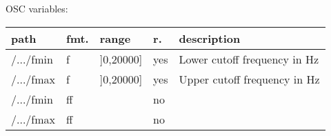 \begin{snugshade}
{\footnotesize
\label{osctab:tascarapbandpass}
OSC variables:
\nopagebreak

\begin{tabularx}{\textwidth}{llllX}
\hline
path & fmt. & range & r. & description\\
\hline
/.../fmin & f & ]0,20000] & yes & Lower cutoff frequency in Hz\\
/.../fmax & f & ]0,20000] & yes & Upper cutoff frequency in Hz\\
/.../fmin & ff &  & no & \\
/.../fmax & ff &  & no & \\
\hline
\end{tabularx}
}
\end{snugshade}
